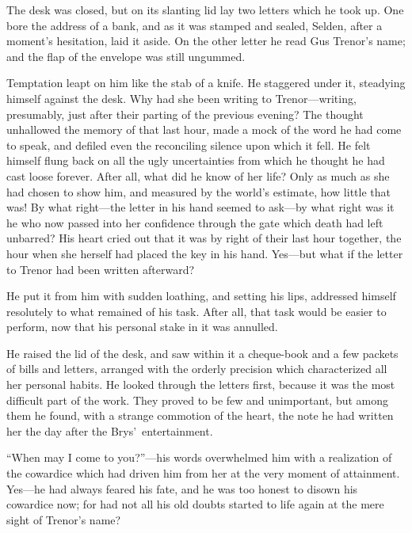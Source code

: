 \documentclass[12pt,a4paper]{book}
\begin{document}
The desk was closed, but on its slanting lid lay two letters
which he took up. One bore the address of a bank, and as it was
stamped and sealed, Selden, after a moment's hesitation, laid it
aside. On the other letter he read Gus Trenor's name; and the
flap of the envelope was still ungummed.





Temptation leapt on him like the stab of a knife. He staggered
under it, steadying himself against the desk. Why had she been
writing to Trenor---writing, presumably, just after their parting
of the previous evening? The thought unhallowed the memory of
that last hour, made a mock of the word he had come to speak, and
defiled even the reconciling silence upon which it fell. He felt
himself flung back on all the ugly uncertainties from which he
thought he had cast loose forever. After all, what did he know of
her life? Only as much as she had chosen to show him, and
measured by the world's estimate, how little that was! By what
right---the letter in his hand seemed to ask---by what right was it
he who now passed into her confidence through the gate which
death had left unbarred? His heart cried out that it was by right
of their last hour together, the hour when she herself had placed
the key in his hand. Yes---but what if the letter to Trenor had
been written afterward?





He put it from him with sudden loathing, and setting his lips,
addressed himself resolutely to what remained of his task. After
all, that task would be easier to perform, now that his personal
stake in it was annulled.





He raised the lid of the desk, and saw within it a cheque-book
and a few packets of bills and letters, arranged with the orderly
precision which characterized all her personal habits. He looked
through the letters first, because it was the most difficult part
of the work. They proved to be few and unimportant, but among
them he found, with a strange commotion of the heart, the note he
had written her the day after the Brys'\ entertainment.





``When may I come to you?''---his words overwhelmed him with a
realization of the cowardice which had driven him from her at the
very moment of attainment. Yes---he had always feared his fate,
and he was too honest to disown his cowardice now; for had not
all his old doubts started to life again at the mere sight of
Trenor's name?
\end{document}
